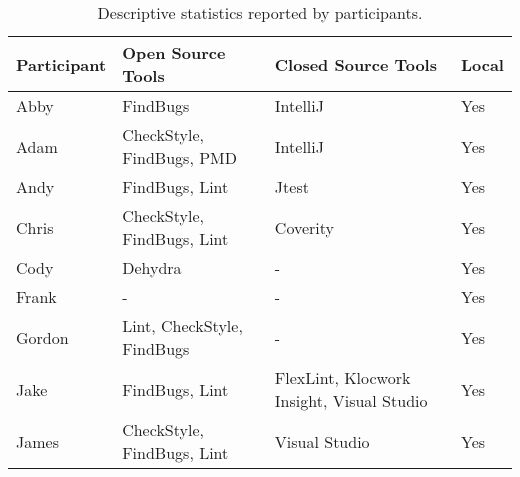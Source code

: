 \begin{table}[]
\centering
\caption{Descriptive statistics reported by participants.}
\label{table:demographics}
\begin{tabular}{llll}
\toprule
\rowcolor{gray!50}
\textbf{Participant} & \textbf{Open Source Tools}                                                                                      & \textbf{Closed Source Tools}              & \textbf{Local} \\
\midrule
Abby                 & FindBugs                                                                                                        & IntelliJ                                  & Yes            \\
Adam                 & CheckStyle, FindBugs, PMD                                                                                       & IntelliJ                                  & Yes            \\
Andy                 & FindBugs, Lint                                                                                                  & Jtest                                     & Yes            \\
Chris                & CheckStyle, FindBugs, Lint                                                                                      & Coverity                                  & Yes            \\
Cody                 & Dehydra                                                                                                         & -                                         & Yes            \\
Frank                & -                                                                                                               & -                                         & Yes            \\
Gordon               & Lint, CheckStyle, FindBugs                                                                                      & -                                         & Yes            \\
Jake                 & FindBugs, Lint                                                                                                  & FlexLint, Klocwork Insight, Visual Studio & Yes            \\
James                & CheckStyle, FindBugs, Lint                                                                                      & Visual Studio                             & Yes            \\

\end{tabular}
\end{table}
